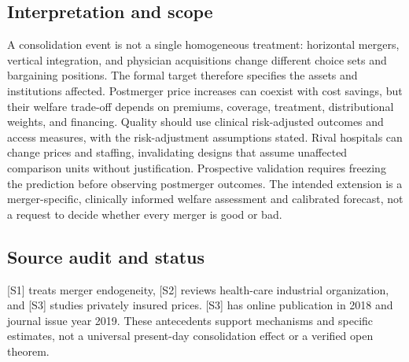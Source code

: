 \documentclass[11pt,a4paper]{article}
\begin{document}
\subsection*{Interpretation and scope}
A consolidation event is not a single homogeneous treatment: horizontal mergers, vertical integration, and physician acquisitions change different choice sets and bargaining positions. The formal target therefore specifies the assets and institutions affected. Postmerger price increases can coexist with cost savings, but their welfare trade-off depends on premiums, coverage, treatment, distributional weights, and financing. Quality should use clinical risk-adjusted outcomes and access measures, with the risk-adjustment assumptions stated. Rival hospitals can change prices and staffing, invalidating designs that assume unaffected comparison units without justification. Prospective validation requires freezing the prediction before observing postmerger outcomes. The intended extension is a merger-specific, clinically informed welfare assessment and calibrated forecast, not a request to decide whether every merger is good or bad.

\subsection*{Source audit and status}
[S1] treats merger endogeneity, [S2] reviews health-care industrial organization, and [S3] studies privately insured prices. [S3] has online publication in 2018 and journal issue year 2019. These antecedents support mechanisms and specific estimates, not a universal present-day consolidation effect or a verified open theorem.
\end{document}
